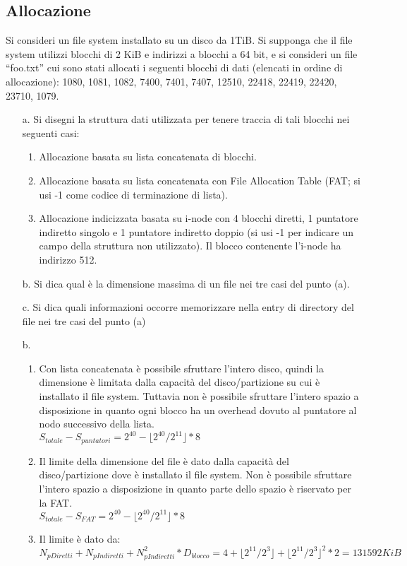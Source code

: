 \documentclass[12pt]{article}
\begin{document}
\subsection{Allocazione}
Si consideri un file system installato su un disco da 1TiB. Si supponga che il file system utilizzi
blocchi di 2 KiB e indirizzi a blocchi a 64 bit, e si consideri un file “foo.txt” cui sono stati allocati i
seguenti blocchi di dati (elencati in ordine di allocazione): 1080, 1081, 1082, 7400, 7401, 7407,
12510, 22418, 22419, 22420, 23710, 1079.
\begin{itemize}
    \item [a.] Si disegni la struttura dati utilizzata per tenere traccia di tali blocchi nei seguenti casi:
    \begin{enumerate}
        \item Allocazione basata su lista concatenata di blocchi.
        \item Allocazione basata su lista concatenata con File Allocation Table (FAT; si usi -1 come codice di terminazione di lista).
        \item Allocazione indicizzata basata su i-node con 4 blocchi diretti, 1 puntatore indiretto singolo e 1 puntatore indiretto doppio (si usi -1 per indicare un campo della struttura non
        utilizzato). Il blocco contenente l'i-node ha indirizzo 512.
    \end{enumerate}
    \item [b.] Si dica qual è la dimensione massima di un file nei tre casi del punto (a).
    \item [c.] Si dica quali informazioni occorre memorizzare nella entry di directory del file nei tre casi del punto (a)\\
\end{itemize}
\begin{itemize}
    \color{blue}
    \item [b.]
    \begin{enumerate}
        \item Con lista concatenata è possibile sfruttare l'intero disco, quindi la dimensione è limitata dalla capacità 
        del disco/partizione su cui è installato il file system. Tuttavia non è possibile sfruttare l'intero spazio a 
        disposizione in quanto ogni blocco ha un overhead dovuto al puntatore al nodo successivo della lista.\\
        $S_{totale}-S_{puntatori}=2^{40}-\lfloor2^{40}/2^{11}\rfloor*8$
        \item Il limite della dimensione del file è dato dalla capacità del disco/partizione dove è installato il file 
        system. Non è possibile sfruttare l'intero spazio a disposizione in quanto parte dello spazio è riservato per la 
        FAT.\\
        $S_{totale}-S_{FAT}=2^{40}-\lfloor2^{40}/2^{11}\rfloor*8$
        \item Il limite è dato da:\\
        $N_{pDiretti}+N_{pIndiretti}+N_{pIndiretti}^2*D_{blocco}=4+\lfloor2^{11}/2^3\rfloor+\lfloor2^{11}/2^3\rfloor^2*2=131592KiB$
    \end{enumerate}
\end{itemize}
\end{document}
